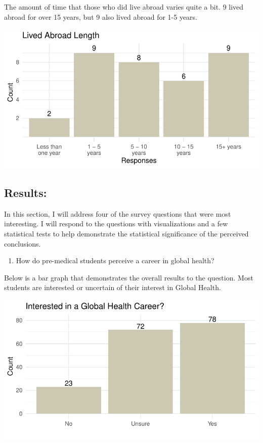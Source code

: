 \documentclass[
  letterpaper,
  DIV=11,
  numbers=noendperiod]{scrartcl}
\providecommand{\tightlist}{%
  \setlength{\itemsep}{0pt}\setlength{\parskip}{0pt}}\usepackage{longtable,booktabs,array}
\begin{document}
The amount of time that those who did live abroad varies quite a bit. 9
lived abroad for over 15 years, but 9 also lived abroad for 1-5 years.

\includegraphics{GlobalHealthQuartoHC_files/figure-pdf/unnamed-chunk-12-1.pdf}

\newpage

\hypertarget{results}{%
\subsection{Results:}\label{results}}

In this section, I will address four of the survey questions that were
most interesting. I will respond to the questions with visualizations
and a few statistical tests to help demonstrate the statistical
significance of the perceived conclusions.

\begin{enumerate}
\def\labelenumi{\arabic{enumi}.}
\tightlist
\item
  How do pre-medical students perceive a career in global health?
\end{enumerate}

Below is a bar graph that demonstrates the overall results to the
question. Most students are interested or uncertain of their interest in
Global Health.

\includegraphics{GlobalHealthQuartoHC_files/figure-pdf/unnamed-chunk-13-1.pdf}
\end{document}
